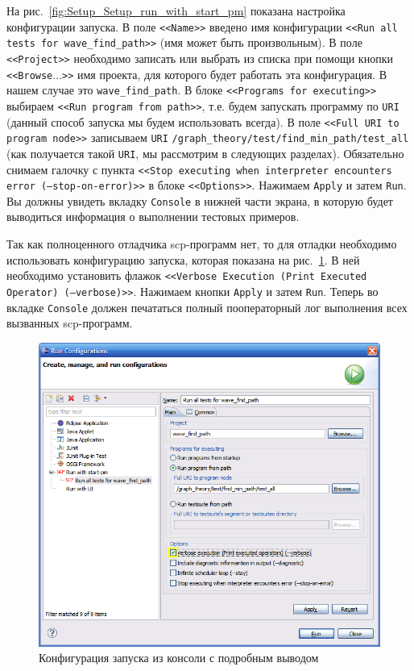 На рис.~\ref{fig:Setup_Setup_run_with_start_pm} показана настройка
конфигурации запуска. В поле \texttt{<<Name>>} введено имя
конфигурации \texttt{<<Run all tests for wave\_find\_path>>} (имя
может быть произвольным). В поле \texttt{<<Project>>} необходимо
записать или выбрать из списка при помощи кнопки
\texttt{<<Browse$\dots$>>} имя проекта, для которого будет работать
эта конфигурация. В нашем случае это \verb|wave_find_path|. В блоке
\texttt{<<Programs for executing>>} выбираем \texttt{<<Run program
  from path>>}, т.е. будем запускать программу по \texttt{URI} (данный
способ запуска мы будем использовать всегда). В поле \texttt{<<Full
  URI to program node>>} записываем \texttt{URI}
\verb|/graph_theory/test/find_min_path/test_all| (как получается такой
\texttt{URI}, мы рассмотрим в следующих разделах). Обязательно снимаем
галочку с пункта \texttt{<<Stop executing when interpreter encounters
  error (--stop-on-error)>>} в блоке \texttt{<<Options>>}. Нажимаем
\texttt{Apply} и затем \texttt{Run}. Вы должны увидеть вкладку
\texttt{Console} в нижней части экрана, в которую будет выводиться
информация о выполнении тестовых примеров.

Так как полноценного отладчика scp-программ нет, то для отладки
необходимо использовать конфигурацию запуска, которая показана на
рис.~\ref{fig:Setup_Run_conf_with_verbose_output}. В ней необходимо
установить флажок \texttt{<<Verbose Execution (Print Executed
  Operator) (--verbose)>>}. Нажимаем кнопки \texttt{Apply} и затем
\texttt{Run}. Теперь во вкладке \texttt{Console} должен печататься
полный пооператорный лог выполнения всех вызванных scp-программ.

\begin{figure}[h!]
  \centering
  \includegraphics[scale=0.7]{images/5/setup/9_Run_conf_with_verbose_output}
  \caption{Конфигурация запуска из консоли с подробным выводом}
  \label{fig:Setup_Run_conf_with_verbose_output}
\end{figure}


